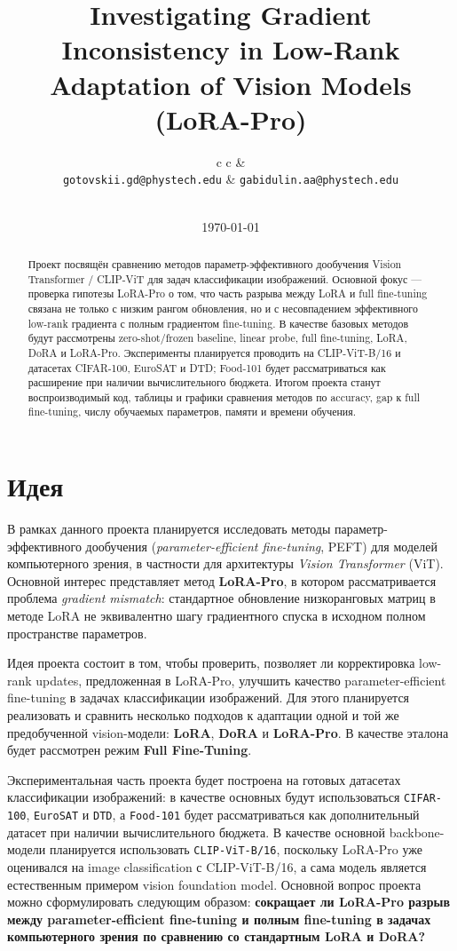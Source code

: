 \documentclass[]{scrartcl}
\title{Investigating Gradient Inconsistency in Low-Rank Adaptation of Vision Models (LoRA-Pro)}
\author{
\begin{tabular}{c c}
\shortstack{Готовский\\Геннадий} & \shortstack{Габидулин\\Андрей} \\
\texttt{gotovskii.gd@phystech.edu} & \texttt{gabidulin.aa@phystech.edu} \\[0.75em]
\multicolumn{2}{c}{\shortstack{Сивачев\\Леонид}} \\
\multicolumn{2}{c}{\texttt{sivachev.ld@phystech.edu}}
\end{tabular}
}
\date{\today}
\begin{document}
\maketitle

\begin{abstract}
Проект посвящён сравнению методов параметр-эффективного дообучения Vision Transformer / CLIP-ViT для задач классификации изображений. Основной фокус --- проверка гипотезы LoRA-Pro о том, что часть разрыва между LoRA и full fine-tuning связана не только с низким рангом обновления, но и с несовпадением эффективного low-rank градиента с полным градиентом fine-tuning. В качестве базовых методов будут рассмотрены zero-shot/frozen baseline, linear probe, full fine-tuning, LoRA, DoRA и LoRA-Pro. Эксперименты планируется проводить на CLIP-ViT-B/16 и датасетах CIFAR-100, EuroSAT и DTD; Food-101 будет рассматриваться как расширение при наличии вычислительного бюджета. Итогом проекта станут воспроизводимый код, таблицы и графики сравнения методов по accuracy, gap к full fine-tuning, числу обучаемых параметров, памяти и времени обучения.
\end{abstract}

\section{Идея}

В рамках данного проекта планируется исследовать методы параметр-эффективного дообучения (\textit{parameter-efficient fine-tuning}, PEFT) для моделей компьютерного зрения, в частности для архитектуры \textit{Vision Transformer} (ViT). Основной интерес представляет метод \textbf{LoRA-Pro}, в котором рассматривается проблема \textit{gradient mismatch}: стандартное обновление низкоранговых матриц в методе LoRA не эквивалентно шагу градиентного спуска в исходном полном пространстве параметров.

Идея проекта состоит в том, чтобы проверить, позволяет ли корректировка low-rank updates, предложенная в LoRA-Pro, улучшить качество parameter-efficient fine-tuning в задачах классификации изображений. Для этого планируется реализовать и сравнить несколько подходов к адаптации одной и той же предобученной vision-модели: \textbf{LoRA}, \textbf{DoRA} и \textbf{LoRA-Pro}. В качестве эталона будет рассмотрен режим \textbf{Full Fine-Tuning}.

Экспериментальная часть проекта будет построена на готовых датасетах классификации изображений: в качестве основных будут использоваться \texttt{CIFAR-100}, \texttt{EuroSAT} и \texttt{DTD}, а \texttt{Food-101} будет рассматриваться как дополнительный датасет при наличии вычислительного бюджета. В качестве основной backbone-модели планируется использовать \texttt{CLIP-ViT-B/16}, поскольку LoRA-Pro уже оценивался на image classification с CLIP-ViT-B/16, а сама модель является естественным примером vision foundation model. Основной вопрос проекта можно сформулировать следующим образом: \textbf{сокращает ли LoRA-Pro разрыв между parameter-efficient fine-tuning и полным fine-tuning в задачах компьютерного зрения по сравнению со стандартным LoRA и DoRA?}
\end{document}
